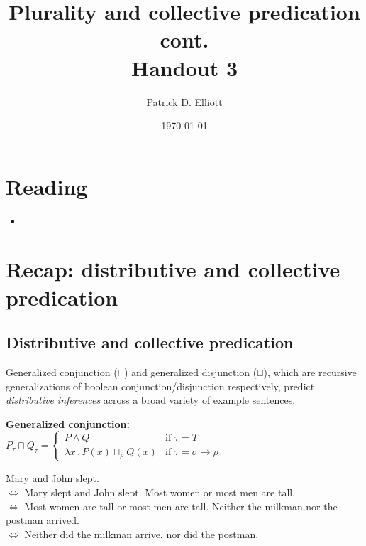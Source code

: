 \documentclass[letterpaper,parskip=half]{scrartcl}
\author{Patrick D. Elliott}
\date{\today}
\title{Plurality and collective predication cont.\\\medskip
\large Handout 3}
\begin{document}
\maketitle
\tableofcontents


\section{Reading}
\label{sec:orgab63bcb}

\begin{itemize}
\item \autocite{Champollion2016}
\end{itemize}

\section{Recap: distributive and collective predication}
\label{sec:orgdfc04c0}

\subsection{Distributive and collective predication}
\label{sec:org69f0dfa}

Generalized conjunction (\(\sqcap\)) and generalized disjunction (\(\sqcup\)), which are recursive generalizations of boolean conjunction/disjunction respectively, predict \textit{distributive inferences} across a broad variety of example sentences.

\begin{exe}
\ex \textbf{Generalized conjunction:}\\[0pt]
 \(P_\tau \sqcap Q_\tau = \begin{cases}
P \wedge Q&\text{if }\tau = T\\
\lambda x\,.\,P(x) \sqcap_\rho Q(x)&\text{if }\tau = \sigma \rightarrow \rho  
\end{cases}\)
\label{org3053c4c}
\end{exe}

\begin{exe}
\ex Mary and John slept.\\[0pt]
\(\iff\) Mary slept and John slept.
\ex Most women or most men are tall.\\[0pt]
\(\iff\) Most women are tall or most men are tall.
\ex Neither the milkman nor the postman arrived.\\[0pt]
\(\iff\) Neither did the milkman arrive, nor did the postman.
\label{org1b3d0ee}
\end{exe}
\end{document}
